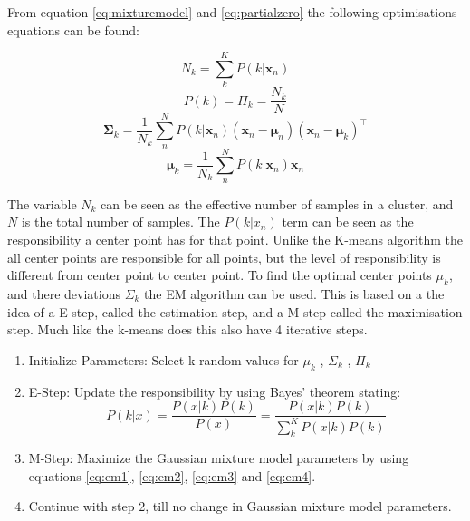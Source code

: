From equation \ref{eq:mixturemodel} and \ref{eq:partialzero} the following optimisations equations can be found: 

\begin{equation}
 N_k = \sum\limits_{k}^K P(k|\textbf{x}_n)
 \label{eq:em1}
\end{equation}
\begin{equation}
 P(k)= \Pi_k = \frac{N_k}{N}
 \label{eq:em2}
\end{equation}
\begin{equation}
 \mathbold{\Sigma}_k= \frac{1}{N_k} \sum\limits_{n}^N{ P(k|\textbf{x}_n) (\textbf{x}_n -\mathbold{\mu}_n)(\textbf{x}_n-\mathbold{\mu}_k)^\intercal}
 \label{eq:em3}
\end{equation}
\begin{equation}
 \mathbold{\mu}_k= \frac{1}{N_k} \sum\limits_{n}^N{ P(k|\mathbold{x}_n) \mathbold{x}_n}
 \label{eq:em4}
\end{equation}

The variable $N_k$ can be seen as the effective number of samples in a cluster, and $N$ is the total number of samples. The $P(k|x_n)$ term can be seen as the responsibility a center point has for that point. Unlike the K-means algorithm the all center points are responsible for all points, but the level of responsibility is different from center point to center point. To find the optimal center points $\mu_k$, and there deviations $\Sigma_k$ the EM algorithm can be used. This is based on a the idea of a E-step, called the estimation step, and a M-step called the maximisation step. Much like the k-means does this also have 4 iterative steps. 


\begin{enumerate}
  \item Initialize Parameters: Select k random values for $\mu_k$ , $\Sigma_k$ , $\Pi_k$
  \item E-Step: Update the responsibility by using Bayes' theorem stating: 
 \begin{equation}
 	P(k|x) = \frac{P(x|k) P(k)}{P(x)} = \frac{P(x|k) P(k)}{\sum\limits_{k}^K{ P(x|k) P(k)}}
 \end{equation}
  
  \item M-Step: Maximize the Gaussian mixture model parameters by using equations \ref{eq:em1}, \ref{eq:em2}, \ref{eq:em3} and \ref{eq:em4}. 
  
  \item Continue with step 2, till no change in Gaussian mixture model parameters. 
\end{enumerate}

